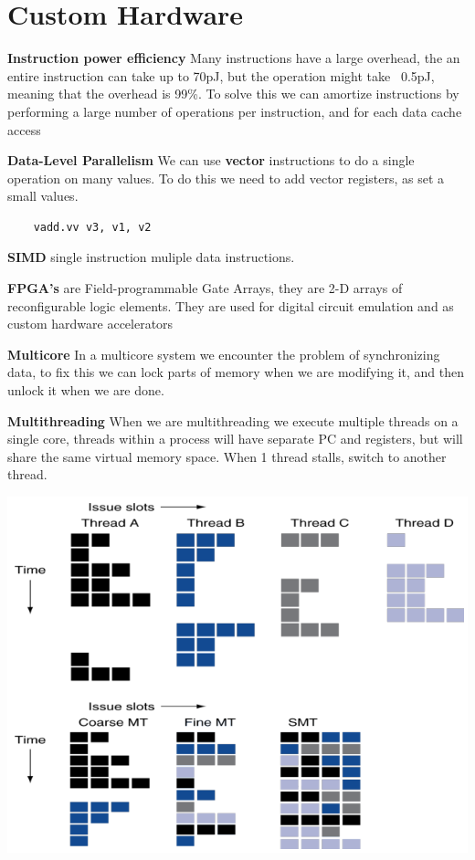 \section{Custom Hardware}

\textbf{Instruction power efficiency}
Many instructions have a large overhead, the an entire instruction can take up to
70pJ, but the operation might take ~0.5pJ, meaning that the overhead is 99\%. To
solve this we can amortize instructions by performing a large number of operations
per instruction, and for each data cache access

\textbf{Data-Level Parallelism} We can use \textbf{vector} instructions to do a
single operation on many values. To do this we need to add vector registers, as
set a small values.
\begin{verbatim}
    vadd.vv v3, v1, v2
\end{verbatim}

\textbf{SIMD} single instruction muliple data instructions.

\textbf{FPGA's} are Field-programmable Gate Arrays, they are 2-D arrays of reconfigurable
logic elements. They are used for digital circuit emulation and as custom hardware
accelerators

\textbf{Multicore} In a multicore system we encounter the problem of synchronizing
data, to fix this we can lock parts of memory when we are modifying it, and then
unlock it when we are done.

\textbf{Multithreading} When we are multithreading we execute multiple threads
on a single core, threads within a process will have separate PC and registers,
but will share the same virtual memory space. When 1 thread stalls, switch to
another thread.

\includegraphics[width=\linewidth]{png/multithread.png}
